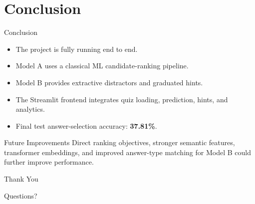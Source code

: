 \documentclass[aspectratio=169,11pt]{beamer}
\begin{document}
\section{Conclusion}

\begin{frame}{Conclusion}
    \begin{itemize}
        \item The project is fully running end to end.
        \item Model A uses a classical ML candidate-ranking pipeline.
        \item Model B provides extractive distractors and graduated hints.
        \item The Streamlit frontend integrates quiz loading, prediction, hints, and analytics.
        \item Final test answer-selection accuracy: \textbf{37.81\%}.
    \end{itemize}

    \begin{block}{Future Improvements}
        Direct ranking objectives, stronger semantic features, transformer embeddings,
        and improved answer-type matching for Model B could further improve performance.
    \end{block}
\end{frame}

\begin{frame}
    \centering
    \Huge Thank You

    \vspace{0.5cm}
    \large Questions?
\end{frame}
\end{document}
